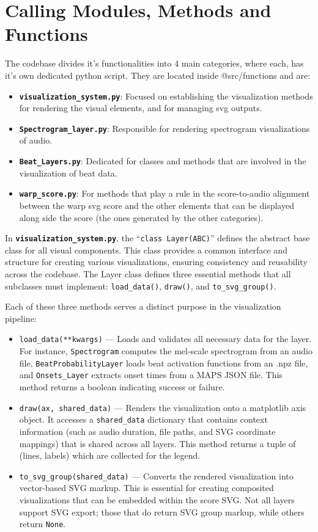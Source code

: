 \section{Calling Modules, Methods and Functions}
The codebase divides it's functionalities into 4 main categories, where each, has it's own dedicated python script. They are located inside @src/functions and are:
\begin{itemize}
    \item \texttt{\textbf{visualization\_system.py}}: Focused on establishing the visualization methods for rendering the visual elements, and for managing svg outputs. 
    \item \texttt{\textbf{Spectrogram\_layer.py}}: Responsible for rendering spectrogram visualizations of audio.
    \item \texttt{\textbf{Beat\_Layers.py}}: Dedicated for classes and methods that are involved in the visualization of beat data.
    \item \texttt{\textbf{warp\_score.py}}: For methods that play a rule in the score-to-audio alignment between the warp svg score and the other elements that can be displayed along side the score (the ones generated by the other categories). 
\end{itemize}

In \texttt{\textbf{visualization\_system.py}}, the  ``\texttt{class Layer(ABC)}'' defines the abstract base class for all visual components. This class provides a common interface and structure for creating various visualizations, ensuring consistency and reusability across the codebase. The Layer class defines three essential methods that all subclasses must implement: \texttt{load\_data()}, \texttt{draw()}, and \texttt{to\_svg\_group()}. 

\noindent Each of these three methods serves a distinct purpose in the visualization pipeline:

\begin{itemize}
    \item \texttt{load_data(**kwargs)} — Loads and validates all necessary data for the layer. For instance, \texttt{Spectrogram} computes the mel-scale spectrogram from an audio file, \texttt{BeatProbabilityLayer} loads beat activation functions from an .npz file, and \texttt{Onsets_Layer} extracts onset times from a MAPS JSON file. This method returns a boolean indicating success or failure.
    \item \texttt{draw(ax, shared\_data)} — Renders the visualization onto a matplotlib axis object. It accesses a \texttt{shared\_data} dictionary that contains context information (such as audio duration, file paths, and SVG coordinate mappings) that is shared across all layers. This method returns a tuple of (lines, labels) which are collected for the legend.
    \item \texttt{to\_svg\_group(shared\_data)} — Converts the rendered visualization into vector-based SVG markup. This is essential for creating composited visualizations that can be embedded within the score SVG. Not all layers support SVG export; those that do return SVG group markup, while others return \texttt{None}.
\end{itemize}


